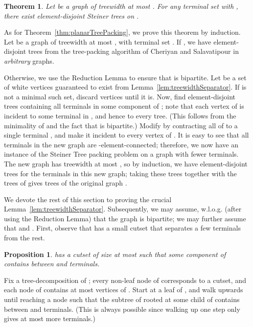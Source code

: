 \documentclass[11pt]{article}
\newtheorem{theorem}[lemma]{Theorem}
\newtheorem{prop}[lemma]{Proposition}
\renewenvironment{proof}{\vspace{-0.1in}\noindent{\bf Proof:}}{\hspace*{\fill}\par}
\newenvironment{proofsketch}{\vspace{-0.1in}\noindent{\bf Proof Sketch:}}{\hspace*{\fill}\par}
\begin{document}
\begin{theorem} \label{thm:treewidth}
  Let  be a graph of treewidth at most .  For any terminal
  set  with , there exist
   element-disjoint Steiner trees on .
\end{theorem}
\begin{proof}
  As for Theorem~\ref{thm:planarTreePacking}, we prove this theorem by
  induction. Let  be a graph of treewidth at most , with
  terminal set . If , we have 
  element-disjoint trees from the tree-packing algorithm of Cheriyan
  and Salavatipour \cite{cs} in \emph{arbitrary} graphs.

  Otherwise, we use the Reduction Lemma to ensure that  is
  bipartite. Let  be a set of white vertices guaranteed to exist
  from Lemma~\ref{lem:treewidthSeparator}. If  is not a minimal
  such set, discard vertices until it is. Now, find  element-disjoint trees containing all terminals in some
  component  of ; note that each vertex of  is incident
  to some terminal in , and hence to every tree. (This follows
  from the minimality of  and the fact that  is bipartite.)
  Modify  by contracting all of  to a single terminal , and
  make it incident to every vertex of . It is easy to see that all
  terminals in the new graph are -element-connected; therefore, we
  now have an instance of the Steiner Tree packing problem on a graph
  with fewer terminals. The new graph has treewidth at most , so
  by induction, we have  element-disjoint trees
  for the terminals in this new graph; taking these trees together
  with the  trees of  gives  trees of the original graph .
\end{proof}

We devote the rest of this section to proving the crucial
Lemma~\ref{lem:treewidthSeparator}.  Subsequently, we may assume,
w.l.o.g. (after using the Reduction Lemma) that the graph  is
bipartite; we may further assume that  and . First, observe that  has a small cutset that separates a
few terminals from the rest.

\begin{prop}
   has a cutset  of size at most  such that some component of
   contains between  and  terminals.
\end{prop}
\begin{proofsketch}
  Fix a tree-decomposition  of ; every non-leaf node of
   corresponds to a cutset, and each node of 
  contains at most  vertices of . Start at a leaf of
  , and walk upwards until reaching a node  such that
  the subtree of  rooted at some child of  contains
  between  and  terminals. (This is always possible since
  walking up one step only gives at most  more terminals.)
\end{proofsketch}
\end{document}
